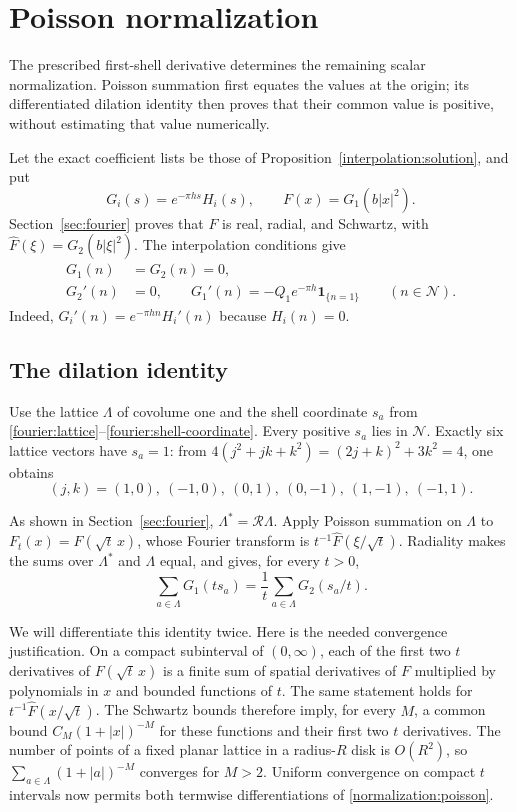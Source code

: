 \section{Poisson normalization}
\label{sec:normalization}

The prescribed first-shell derivative determines the remaining scalar
normalization.  Poisson summation first equates the values at the origin;
its differentiated dilation identity then proves that their common value is
positive, without estimating that value numerically.

Let the exact coefficient lists be those of
Proposition~\ref{interpolation:solution}, and put
\[
 G_i(s)=e^{-\pi hs}H_i(s),\qquad F(x)=G_1(b|x|^2).
\]
Section~\ref{sec:fourier} proves that $F$ is real, radial, and Schwartz,
with $\widehat F(\xi)=G_2(b|\xi|^2)$.  The interpolation conditions give
\begin{equation}\label{normalization:jets}
 \begin{split}
 G_1(n)&=G_2(n)=0,\\
 G_2'(n)&=0,\qquad
 G_1'(n)=-Q_1e^{-\pi h}\mathbf1_{\{n=1\}}
 \qquad(n\in\mathcal N).
 \end{split}
\end{equation}
Indeed, $G_i'(n)=e^{-\pi hn}H_i'(n)$ because $H_i(n)=0$.

\subsection{The dilation identity}

Use the lattice $\Lambda$ of covolume one and the shell coordinate $s_a$ from
\eqref{fourier:lattice}--\eqref{fourier:shell-coordinate}.  Every positive
$s_a$ lies in $\mathcal N$.  Exactly six lattice vectors have
$s_a=1$: from
$4(j^2+jk+k^2)=(2j+k)^2+3k^2=4$, one obtains
\[
 (j,k)=(1,0),\ (-1,0),\ (0,1),\ (0,-1),\ (1,-1),\ (-1,1).
\]

As shown in Section~\ref{sec:fourier}, $\Lambda^*=\mathcal R\Lambda$.
Apply Poisson summation on $\Lambda$ to
$F_t(x)=F(\sqrt t\,x)$, whose Fourier transform is
$t^{-1}\widehat F(\xi/\sqrt t)$.  Radiality makes the sums over
$\Lambda^*$ and $\Lambda$ equal, and gives, for every $t>0$,
\begin{equation}\label{normalization:poisson}
 \sum_{a\in\Lambda}G_1(ts_a)
 =\frac1t\sum_{a\in\Lambda}G_2(s_a/t).
\end{equation}

We will differentiate this identity twice.  Here is the needed convergence
justification.  On a compact subinterval of $(0,\infty)$, each of the first
two $t$ derivatives of $F(\sqrt t\,x)$ is a finite sum of spatial derivatives
of $F$ multiplied by polynomials in $x$ and bounded functions of $t$.
The same statement holds for $t^{-1}\widehat F(x/\sqrt t)$.
The Schwartz bounds therefore imply, for every $M$, a common bound
$C_M(1+|x|)^{-M}$ for these functions and their first two $t$ derivatives.
The number of points of a fixed planar lattice in a radius-$R$ disk is
$O(R^2)$, so $\sum_{a\in\Lambda}(1+|a|)^{-M}$ converges for $M>2$.
Uniform convergence on compact $t$ intervals now permits both termwise
differentiations of \eqref{normalization:poisson}.

